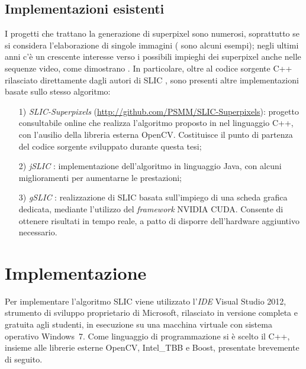 \documentclass[12pt,a4paper,oneside]{article}
\begin{document}
\subsection{Implementazioni esistenti}
I progetti che trattano la generazione di superpixel sono numerosi, soprattutto se si considera l'elaborazione di singole immagini (\cite{ACHANTA_SLIC,GENERATIVE_PIETRO,COMANICIU_MEAN_SHIFT,MALIK_NORMALIZED_CUTS,FELZENSZWALB_GRAPH,GRID_SEAMS} sono alcuni esempi); negli ultimi anni c'è un crescente interesse verso i possibili impieghi dei superpixel anche nelle sequenze video, come dimostrano \cite{DRUCKER_FAST_SUPERPIXELS_VIDEO, CHANG_TEMPORAL_SUPERPIXELS}. In particolare, oltre al codice sorgente \mbox{C++} rilasciato direttamente dagli autori di \gls{SLIC} \cite{ACHANTA_SLIC}, sono presenti altre implementazioni basate sullo stesso algoritmo:
\begin{enumerate}
	\item[1)]\textit{SLIC-Superpixels} (\url{http://github.com/PSMM/SLIC-Superpixels}): progetto consultabile online che realizza l'algoritmo proposto in \cite{ACHANTA_SLIC} nel linguaggio \mbox{C++}, con l'ausilio della libreria esterna \gls{OpenCV}. Costituisce il punto di partenza del codice sorgente sviluppato durante questa tesi; 
	\item[2)]\textit{jSLIC} \cite{BOROVEC_jSLIC}: implementazione dell'algoritmo in linguaggio Java, con alcuni miglioramenti per aumentarne le prestazioni;
	\item[3)]\textit{gSLIC} \cite{YUHENG_gSLIC}: realizzazione di \gls{SLIC} basata sull'impiego di una scheda grafica dedicata, mediante l'utilizzo del \textit{framework} NVIDIA CUDA. Consente di ottenere risultati in tempo reale, a patto di disporre dell'hardware aggiuntivo necessario.
\end{enumerate}
\newpage





\section{Implementazione}\label{Implementazione}


Per implementare l'algoritmo \gls{SLIC} viene utilizzato l'\textit{\gls{IDE}} Visual Studio 2012, strumento di sviluppo proprietario di Microsoft, rilasciato in versione completa e gratuita agli studenti, in esecuzione su una macchina virtuale con sistema operativo Windows~7. Come linguaggio di programmazione si è scelto il \mbox{C++}, insieme alle librerie esterne \gls{OpenCV}, \gls{Intel_TBB} e Boost, presentate brevemente di seguito.
\newline
\end{document}
